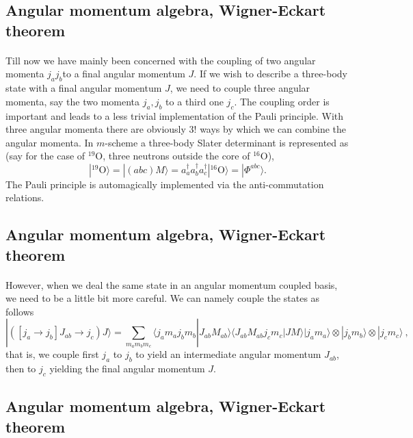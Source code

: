 \documentclass[%
twoside,                 %
final,                   %
10pt]{article}
\begin{document}
\subsection*{Angular momentum algebra, Wigner-Eckart theorem}

\paragraph{}
Till now we have mainly been concerned with the coupling of two angular momenta $j_aj_b$to a final angular momentum $J$.
If we wish to describe a three-body state with a final angular momentum $J$, we need to couple three angular momenta, say 
the two momenta $j_a,j_b$ to a third one $j_c$. The coupling order is important and leads to a less trivial implementation of the 
Pauli principle. With three angular momenta there are obviously $3!$ ways by which we can combine the angular momenta. 
In $m$-scheme a three-body Slater determinant is represented as (say for the case of $^{19}$O, three neutrons outside the core of $^{16}$O),
\[
|^{19}\mathrm{O}\rangle =|(abc)M\rangle  = a^{\dagger}_aa^{\dagger}_ba^{\dagger}_c|^{16}\mathrm{O}\rangle=|\Phi^{abc}\rangle.
\]
The Pauli principle is automagically implemented via the anti-commutation relations.


\subsection*{Angular momentum algebra, Wigner-Eckart theorem}

\paragraph{}
However, when we deal the same state in an angular momentum coupled basis, we need to be a little bit more careful. We can namely couple the states
as follows
\[
| ([j_a\rightarrow j_b]J_{ab}\rightarrow j_c) J\rangle= \sum_{m_am_bm_c}\langle j_am_aj_bm_b|J_{ab}M_{ab}\rangle \langle J_{ab}M_{ab}j_cm_c|JM\rangle|j_am_a\rangle\otimes |j_bm_b\rangle \otimes |j_cm_c\rangle \ , 
\label{eq:fabc}
\]
that is, we couple first $j_a$ to $j_b$ to yield an intermediate angular momentum $J_{ab}$, then to $j_c$ yielding the final angular momentum $J$.



\subsection*{Angular momentum algebra, Wigner-Eckart theorem}
\end{document}
